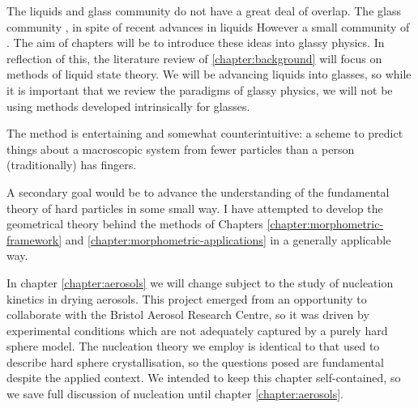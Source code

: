 \documentclass[11pt,twoside]{report}
\def\includebibliography{}
\begin{document}
The liquids and glass community do not have a great deal of overlap.
The glass community , in spite of recent advances in liquids
However a small community of .
The aim of chapters will be to introduce these ideas into glassy physics.
In reflection of this, the literature review of \ref{chapter:background} will focus on methods of liquid state theory.
We will be advancing liquids into glasses, so while it is important that we review the paradigms of glassy physics, we will not be using methods developed intrinsically for glasses.

The method is entertaining and somewhat counterintuitive: a scheme to predict things about a macroscopic system from fewer particles than a person (traditionally) has fingers.

A secondary goal would be to advance the understanding of the fundamental theory of hard particles in some small way.
I have attempted to develop the geometrical theory behind the methods of Chapters \ref{chapter:morphometric-framework} and \ref{chapter:morphometric-applications} in a generally applicable way.

In chapter \ref{chapter:aerosols} we will change subject to the study of nucleation kinetics in drying aerosols.
This project emerged from an opportunity to collaborate with the Bristol Aerosol Research Centre, so it was driven by experimental conditions which are not adequately captured by a purely hard sphere model.
The nucleation theory we employ is identical to that used to describe hard sphere crystallisation, so the questions posed are fundamental despite the applied context.
We intended to keep this chapter self-contained, so we save full discussion of nucleation until chapter \ref{chapter:aerosols}.

\ifdefined\includebibliography
  \printbibliography
\fi
  
\end{document}
